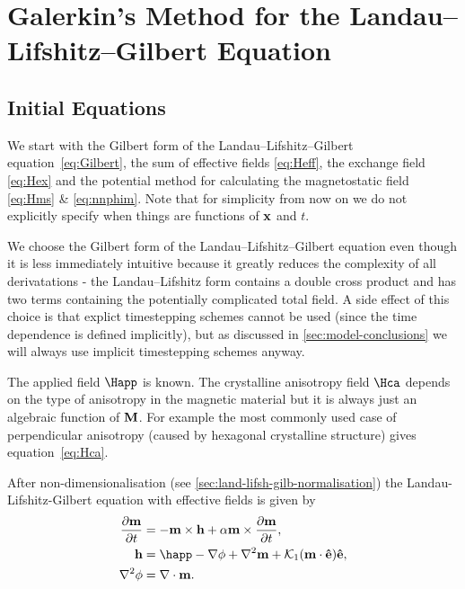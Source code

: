 \chapter{Galerkin's Method for the Landau--Lifshitz--Gilbert Equation}
\label{sec:galerk-meth-llg}

\section{Initial Equations}
\label{sec:llg-initial-equations}

We start with the Gilbert form of the Landau--Lifshitz--Gilbert equation~\eqref{eq:Gilbert}, the sum of effective fields \eqref{eq:Heff}, the exchange field \eqref{eq:Hex} and the potential method for calculating the magnetostatic field \eqref{eq:Hms} \& \eqref{eq:nnphim}. Note that for simplicity from now on we do not explicitly specify when things are functions of $\mathbf{x}$ and $t$.

We choose the Gilbert form of the Landau--Lifshitz--Gilbert equation even though it is less immediately intuitive because it greatly reduces the complexity of all derivatations - the Landau--Lifshitz form contains a double cross product and has two terms containing the potentially complicated total field. A side effect of this choice is that explict timestepping schemes cannot be used (since the time dependence is defined implicitly), but as discussed in \autoref{sec:model-conclusions} we will always use implicit timestepping schemes anyway.

The applied field $\Happ$ is known. The crystalline anisotropy field $\Hca$ depends on the type of anisotropy in the magnetic material but it is always just an algebraic function of $\mathbf{M}$. For example the most commonly used case of perpendicular anisotropy (caused by hexagonal crystalline structure) gives equation~\eqref{eq:Hca}.

After non-dimensionalisation (see \autoref{sec:land-lifsh-gilb-normalisation}) the Landau-Lifshitz-Gilbert equation with effective fields is given by
\begin{equation}
  \begin{aligned}
    \dmdt &= - \mv \times \hv + \alpha \mv \times \dmdt, \\
    \hv &= \happ - \nabla \phim + \lap \mv + \kone (\mv \cdot \ev) \ev, \\
    \lap \phim &= \div \mv.
    \label{eqn:ndllg-starting}
  \end{aligned}
\end{equation}


